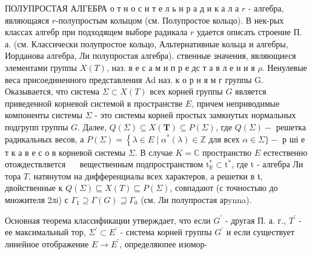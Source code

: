 \documentclass[10pt]{article}
\begin{document}
ПОЛУПРОСТАЯ АЛГЕБРА о т н о с и т е л ь н р а д и к а л а $r$ - алгебра, являющаяся $r$-полупростым колыцом (см. Полупростое кольцо). В нек-рых классах алгебр при подходящем выборе радикала $r$ удается описать строение П. а. (см. Классически полупростое кольцо, Альтернативные кольца и алгебры, Иорданова алгебра, Ли полупростая алгебра). ственные значения, являющиеся элементами группы $X(T)$, наз. в е с а м и п р е дс т а в л е н и я $\rho$. Ненулевые веса присоединенного представления Ad наз. к о р н я м г группы G. Оказывается, что система $\Sigma \subset X(T)$ всех корней группы $G$ является приведенной корневой системой в пространстве $E$, причем неприводимые компоненты системы $\Sigma$ - это системы корней простых замкнутых нормальных подгрупп группы $G$. Далее, $Q(\Sigma) \subseteq X(\boldsymbol{T}) \subseteq P(\Sigma)$, где $Q(\Sigma)-$ решетка радикальных весов, а $P(\Sigma)=\left\{\lambda \in E \mid \alpha^{*}(\lambda) \in \mathbb{Z}\right.$ для всех $\alpha \in \Sigma\}-$ р ші е т к а в е с о в корневой системы $\Sigma$. В случае $K=\mathbb{C}$ пространство $E$ естественно отождествляется $\quad$ вещественным подпространством $\mathrm{t}_{\mathbb{R}}^{*} \subset \mathrm{t}^{*}$, где $\mathrm{t}$ - алгебра Ли тора $T$, натянутом на дифференциалы всех характеров, а решетки в $\mathfrak{t}$, двойственные к $Q(\Sigma) \sqsubseteq X(T) \sqsubseteq P(\Sigma)$, совпадают (с точностыю до множителя 2лi) с $\Gamma_{1} \supseteq \Gamma(G) \sqsupseteq \Gamma_{0}$ (см. Ли полупростая арynna).



Основная теорема классификации утверждает, что если $G^{\prime}$ - другая П. а. г., $T^{\prime}$ - ее максимальный тор, $\Sigma^{\prime} \subset E^{\prime}$ - система корней группы $G^{\prime}$ и если существует линейное отображение $E \rightarrow E^{\prime}$, определяюпее изомор-
\end{document}
